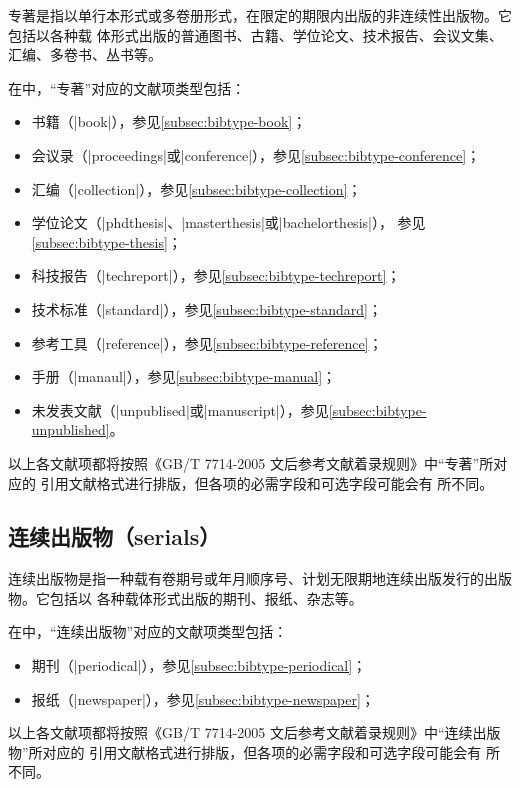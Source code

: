 专著是指以单行本形式或多卷册形式，在限定的期限内出版的非连续性出版物。它包括以各种载
体形式出版的普通图书、古籍、学位论文、技术报告、会议文集、汇编、多卷书、丛书等。

在{\njuthesis}中，“专著”对应的{\BibTeX}文献项类型包括：
\begin{itemize}
\item 书籍（|book|），参见\ref{subsec:bibtype-book}；
\item 会议录（|proceedings|或|conference|），参见\ref{subsec:bibtype-conference}；
\item 汇编（|collection|），参见\ref{subsec:bibtype-collection}；
\item 学位论文（|phdthesis|、|masterthesis|或|bachelorthesis|），
 参见\ref{subsec:bibtype-thesis}；
\item 科技报告（|techreport|），参见\ref{subsec:bibtype-techreport}；
\item 技术标准（|standard|），参见\ref{subsec:bibtype-standard}；
\item 参考工具（|reference|），参见\ref{subsec:bibtype-reference}；
\item 手册（|manaul|），参见\ref{subsec:bibtype-manual}；
\item 未发表文献（|unpublised|或|manuscript|），参见\ref{subsec:bibtype-unpublished}。
\end{itemize}

以上各文献项都将按照《GB/T 7714-2005 文后参考文献着录规则》中“专著”所对应的
引用文献格式进行排版\cite{gbt7714-2005}，但各项的必需字段和可选字段可能会有
所不同。

\subsection{连续出版物（serials）}

连续出版物是指一种载有卷期号或年月顺序号、计划无限期地连续出版发行的出版物。它包括以
各种载体形式出版的期刊、报纸、杂志等。

在{\njuthesis}中，“连续出版物”对应的{\BibTeX}文献项类型包括：
\begin{itemize}
\item 期刊（|periodical|），参见\ref{subsec:bibtype-periodical}；
\item 报纸（|newspaper|），参见\ref{subsec:bibtype-newspaper}；
\end{itemize}

以上各文献项都将按照《GB/T 7714-2005 文后参考文献着录规则》中“连续出版物”所对应的
引用文献格式进行排版\cite{gbt7714-2005}，但各项的必需字段和可选字段可能会有
所不同。

